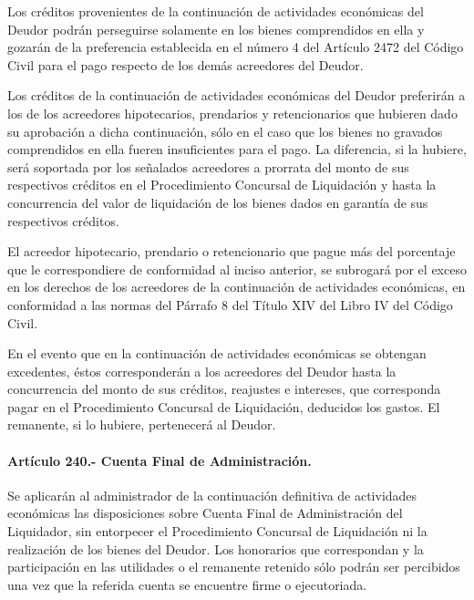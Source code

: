 \documentclass[
]{book}
\begin{document}
Los créditos provenientes de la continuación de actividades económicas del Deudor podrán perseguirse solamente en los bienes comprendidos en ella y gozarán de la preferencia establecida en el número 4 del Artículo 2472 del Código Civil para el pago respecto de los demás acreedores del Deudor.

Los créditos de la continuación de actividades económicas del Deudor preferirán a los de los acreedores hipotecarios, prendarios y retencionarios que hubieren dado su aprobación a dicha continuación, sólo en el caso que los bienes no gravados comprendidos en ella fueren insuficientes para el pago. La diferencia, si la hubiere, será soportada por los señalados acreedores a prorrata del monto de sus respectivos créditos en el Procedimiento Concursal de Liquidación y hasta la concurrencia del valor de liquidación de los bienes dados en garantía de sus respectivos créditos.

El acreedor hipotecario, prendario o retencionario que pague más del porcentaje que le correspondiere de conformidad al inciso anterior, se subrogará por el exceso en los derechos de los acreedores de la continuación de actividades económicas, en conformidad a las normas del Párrafo 8 del Título XIV del Libro IV del Código Civil.

En el evento que en la continuación de actividades económicas se obtengan excedentes, éstos corresponderán a los acreedores del Deudor hasta la concurrencia del monto de sus créditos, reajustes e intereses, que corresponda pagar en el Procedimiento Concursal de Liquidación, deducidos los gastos. El remanente, si lo hubiere, pertenecerá al Deudor.

\hypertarget{artuxedculo-240.--cuenta-final-de-administraciuxf3n.}{%
\paragraph*{Artículo 240.- Cuenta Final de Administración.}\label{artuxedculo-240.--cuenta-final-de-administraciuxf3n.}}

Se aplicarán al administrador de la continuación definitiva de actividades económicas las disposiciones sobre Cuenta Final de Administración del Liquidador, sin entorpecer el Procedimiento Concursal de Liquidación ni la realización de los bienes del Deudor. Los honorarios que correspondan y la participación en las utilidades o el remanente retenido sólo podrán ser percibidos una vez que la referida cuenta se encuentre firme o ejecutoriada.
\end{document}
